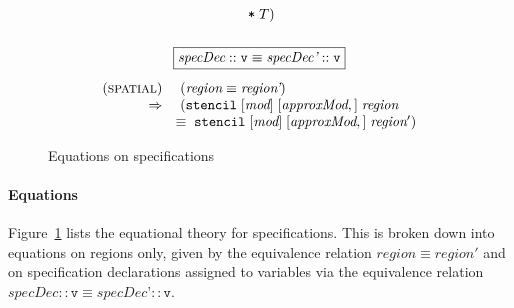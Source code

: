 \documentclass[9pt]{sigplanconf}
\theoremstyle{definition}
\begin{document}
\begin{figure}
\begin{align*}
\begin{array}{c}
\begin{array}{rll}
                       \; \texttt{*} \; T) \\[0.5em]
\end{array} \\ \\
%
\framebox{${\textit{specDec} :: \texttt{v}} \equiv
{\textit{specDec'} :: \texttt{v}}$} \\[1em]
\begin{array}{rl}
(\textsc{spatial}) \; &
(\textit{region} \equiv \textit{region'}) \\
\Rightarrow \; & (\texttt{stencil} \; [\textit{mod}] \; [\textit{approxMod},] \;
\textit{region} \\
& \!\!\equiv \; \texttt{stencil} \; [\textit{mod}] \;
            [\textit{approxMod},] \;
\textit{region}') \\
\end{array}
\end{array}
\end{align*}
\caption{Equations on specifications}
\label{fig:equations}
\end{figure}


\paragraph{Equations}
Figure~\ref{fig:equations} lists the equational theory for
specifications. This is broken down into equations on regions only,
given by the equivalence relation $\textit{region} \equiv \textit{region}'$ and
on specification declarations assigned to variables via the equivalence relation
$\textit{specDec} :: \texttt{v} \equiv
\textit{specDec'} :: \texttt{v}$.
\end{document}
